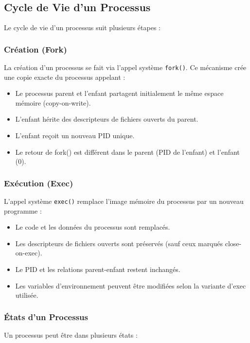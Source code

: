 \documentclass[12pt,a4paper]{article}
\begin{document}
\subsection{Cycle de Vie d'un Processus}

Le cycle de vie d'un processus suit plusieurs étapes :

\subsubsection{Création (Fork)}
La création d'un processus se fait via l'appel système \texttt{fork()}. Ce mécanisme crée une copie exacte du processus appelant :

\begin{itemize}
    \item Le processus parent et l'enfant partagent initialement le même espace mémoire (copy-on-write).
    \item L'enfant hérite des descripteurs de fichiers ouverts du parent.
    \item L'enfant reçoit un nouveau PID unique.
    \item Le retour de fork() est différent dans le parent (PID de l'enfant) et l'enfant (0).
\end{itemize}

\subsubsection{Exécution (Exec)}
L'appel système \texttt{exec()} remplace l'image mémoire du processus par un nouveau programme :

\begin{itemize}
    \item Le code et les données du processus sont remplacés.
    \item Les descripteurs de fichiers ouverts sont préservés (sauf ceux marqués close-on-exec).
    \item Le PID et les relations parent-enfant restent inchangés.
    \item Les variables d'environnement peuvent être modifiées selon la variante d'exec utilisée.
\end{itemize}

\subsubsection{États d'un Processus}

Un processus peut être dans plusieurs états :
\end{document}
